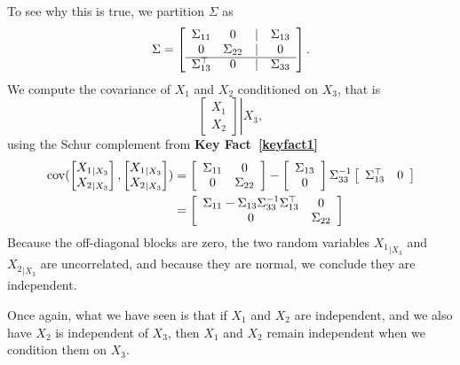 To see why this is true, we partition $\Sigma$ as
 $$ \Sigma = \left[ \begin{array}{cccc} \Sigma_{11} & 0 & |& \Sigma_{13} \\ 0 & \Sigma_{22} & | & 0 \\
 \cline{1-4}
  \Sigma_{13}^\top & 0 &| & \Sigma_{33} \end{array}  \right].$$
 We compute the covariance of $X_1$ and $X_2$ conditioned on $X_3$, that is
 $$ \left. \begin{bmatrix} X_1 \\ X_2  \end{bmatrix} \right| {X_3}, $$
using the Schur complement from \textbf{Key Fact~\ref{keyfact1}}
\begin{align*} \mathrm{cov}( \begin{bmatrix} {X_1}_{|X_3} \\ {X_2}_{|X_3}  \end{bmatrix} ,  \begin{bmatrix} {X_1}_{|X_3} \\ {X_2}_{|X_3}  \end{bmatrix}) &=  \left[ \begin{array}{cc} \Sigma_{11} & 0 \\ 0 & \Sigma_{22} \end{array}  \right] -  \left[ \begin{array}{c} \Sigma_{13} \\ 0 \end{array}  \right] \Sigma_{33}^{-1} \left[ \begin{array}{cc} \Sigma_{13}^\top & 0 \end{array}  \right]\\
&= \left[ \begin{array}{cc} \Sigma_{11} - \Sigma_{13}\Sigma_{33}^{-1} \Sigma_{13}^\top & 0 \\ 0 & \Sigma_{22} \end{array}  \right]
\end{align*}
Because the off-diagonal blocks are zero, the two random variables ${X_1}_{|X_3}$ and  ${X_2}_{|X_3}$ are uncorrelated, and because they are normal, we conclude they are independent.

\begin{mdframed} Once again, what we have seen is that if $X_1$ and $X_2$ are independent, and we also have $X_2$ is independent of $X_3$, then $X_1$ and $X_2$ remain independent when we condition them on $X_3$.
\end{mdframed} 



